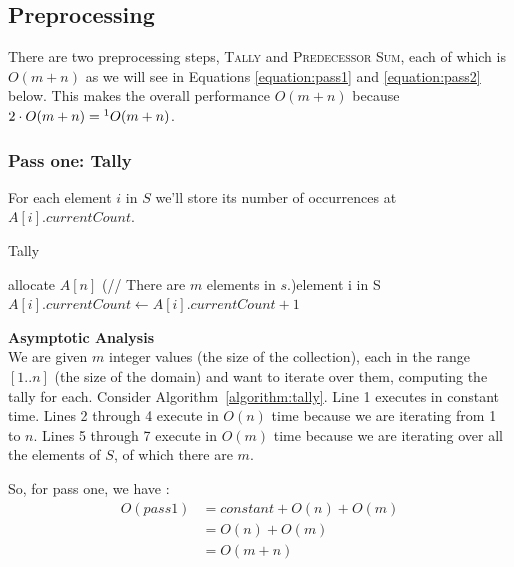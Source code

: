 \documentclass[10pt]{article}
\begin{document}
\subsection{Preprocessing}
There are two preprocessing steps, \textsc{Tally} and \textsc{Predecessor Sum}, each of which is $O(m+n)$ as we will see in Equations \ref{equation:pass1} and \ref{equation:pass2} below.
This makes the overall performance $O(m+n)$ because 
$2 \cdot O(m+n) =\footnote{This is an abuse of the notation, but if it's okay in the CLRS~\cite{clrs} book I hope it's okay here.} O(m+n)$.


\subsubsection{Pass one: Tally}
For each element $i$ in $S$ we'll store its number of occurrences at $A[i].currentCount$.

\begin{algorithm}[H]
    \SetAlgoLined
    \caption{Tally}
    \label{algorithm:tally}
   
    allocate $A[n]$\;
    \ForEach(// There are $m$ elements in $s$.){element i in S}{
         $A[i].currentCount \leftarrow A[i].currentCount + 1$\;
    }
\end{algorithm}

\textbf{Asymptotic Analysis} \\
We are given $m$ integer values (the size of the collection), each in the range $[1..n]$ (the size of the domain) and want to iterate over them, computing the tally for each.
Consider Algorithm~\ref{algorithm:tally}.
Line 1 executes in constant time.
Lines 2 through 4 execute in $O(n)$ time because we are iterating from 1 to $n$.  
Lines 5 through 7 execute in $O(m)$ time because we are iterating over all the elements of $S$, of which there are $m$.  


So, for pass one, we have :
\begin{equation}   
   \label{equation:pass1}   
   \begin{split}
   O(pass1) & = constant + O(n) + O(m)\\
            & = O(n) + O(m)\\
            & = O(m+n)   
   \end{split}
\end{equation}
\end{document}
